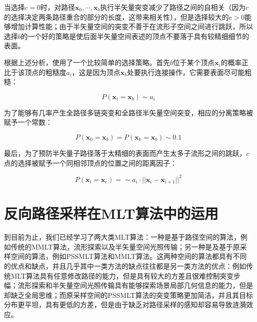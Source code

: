 当选择$c=0$时，对路径$\mathbf{x}_0,\cdots,\mathbf{x}_b$执行半矢量突变减少了路径之间的自相关（因为$c$的选择决定两条路径重合的部分的长度，这带来相关性），但是选择较大的$c>0$能够增加计算性能；由于半矢量空间的突变不善于在流形子空间之间进行跳跃，所以选择$b$的一个好的策略是使后面半矢量空间表述的顶点不要落于具有较精细细节的表面。

根据上述分析，\cite{a:ImprovedHalfVectorSpaceLightTransport}使用了一个比较简单的选择策略。首先$b$位于某个顶点$\mathbf{x}_i$的概率正比于该顶点的粗糙度$a_i$，这是因为顶点$\mathbf{x}_b$处要执行连接操作，它需要表面尽可能粗糙：

\begin{equation}
	P(\mathbf{x}_i=\mathbf{x}_b)\sim a_i
\end{equation}

为了能够有几率产生全路径多链突变和全路径半矢量空间突变，相应的分离策略被赋予一个常数：

\begin{equation}
	P(\mathbf{x}_0=\mathbf{x}_b)=P(\mathbf{x}_k=\mathbf{x}_b)\sim 0.1
\end{equation}

最后，为了预防半矢量子路径落于太精细的表面而产生太多子流形之间的跳跃，$c$点的选择被赋予一个同相邻顶点的位置之间的距离因子：

\begin{equation}
	P(\mathbf{x}_i=\mathbf{x}_c)=\sim a_i\cdot||\mathbf{x}_i-\mathbf{x}_{i+1}||^{2}
\end{equation}







 
\section{反向路径采样在MLT算法中的运用}\label{sec:mlt-combine-space}
到目前为止，我们已经学习了两大类MLT算法：一种是基于路径空间的算法，例如传统的MMLT算法，流形探索以及半矢量空间光照传输；另一种是及基于原采样空间的算法，例如PSSMLT算法和MMLT算法。这两种空间的算法都具有不同的优点和缺点，并且几乎其中一类方法的缺点往往都是另一类方法的优点：例如传统MLT算法具有任意修改路径的能力，但是具有较大的方差且很难控制突变步幅；流形探索和半矢量空间光照传输具有能够探索场景局部几何信息的能力，但是却缺乏全局思维；而原采样空间的PSSMLT算法的突变策略更加简洁，并且其目标分布更平坦，具有更低的方差，但是由于缺乏对路径采样的感知却容易导致涟漪效应。

